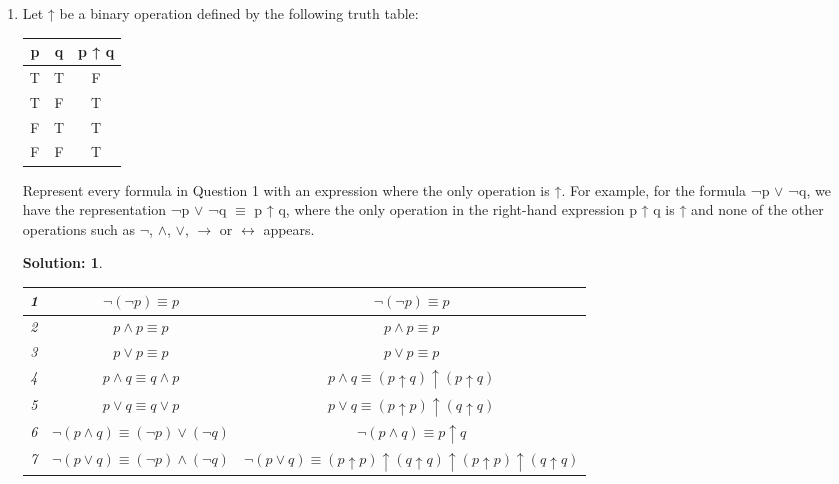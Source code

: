 \documentclass{article}
\theoremstyle{break}
\newtheorem*{solution*}{\textbf{Solution:} }
\begin{document}
\begin{enumerate}
        \newpage
        \item 
        Let ↑ be a binary operation defined by the following truth table:
        \newline
        \begin{center}
            \begin{tabular}{|c|c|c|}
                \hline
                p &q &p ↑ q\\
                \hline
                T &T& F\\
                \hline
                T& F &T\\
                \hline
                F& T& T\\
                \hline
                F &F &T\\
                \hline
            \end{tabular}
        \end{center}
        Represent every formula in Question 1 with an expression where the only operation is ↑.  For
        example,  for  the  formula  ¬p $\lor$ ¬q,  we  have  the  representation  ¬p $\lor$ ¬q  $\equiv$ p  ↑ q,  where  
        the only operation in the right-hand expression p ↑ q  is ↑ and none of the other operations such
        as $\lnot$, $\land$, $\lor$, $\to$ or $\leftrightarrow$ appears.
        \begin{solution*}\leavevmode\\
        \begin{center}
            \begin{tabular}{|c|c|c|}
                \hline
                1 & $\lnot ( \lnot p ) \equiv p $ &$\lnot ( \lnot p) \equiv  p$ \\
                \hline
                2 &  $p \land p \equiv p$ &$p \land p \equiv p $ \\
                \hline
                3 &  $p \lor p \equiv p $ & $p \lor p \equiv p$ \\
                \hline
                4 & $p \land q \equiv q \land p$ & $p \land q \equiv (p \uparrow q ) \uparrow (p \uparrow q)$\\
                \hline
                5 & $ p \lor q \equiv q \lor p $ & $p \lor q \equiv  (p \uparrow   p) \uparrow (q \uparrow q)$  \\
                \hline
                6 & $ \lnot(p \land q)\equiv (\lnot p)\lor (\lnot q)$ & $\lnot(p \land q)\equiv  p \uparrow q$ \\
                \hline
                7 & $ \lnot(p \lor q)\equiv (\lnot p)\land (\lnot q)$ & $\lnot(p \lor q)\equiv (p \uparrow p) \uparrow (q \uparrow q) \uparrow (p \uparrow p) \uparrow (q \uparrow q)  $\\

\end{tabular}
\end{center}
\end{solution*}
\end{enumerate}
\end{document}
